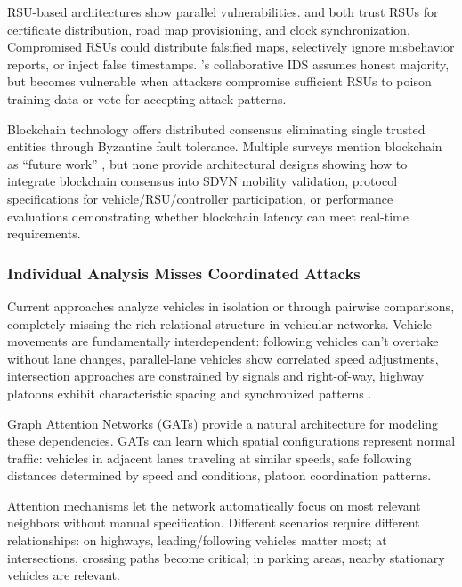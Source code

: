\documentclass[12pt, a4paper]{report}
\begin{document}
RSU-based architectures show parallel vulnerabilities. \cite{ghaleb2014} and \cite{raja2021} both trust RSUs for certificate distribution, road map provisioning, and clock synchronization. Compromised RSUs could distribute falsified maps, selectively ignore misbehavior reports, or inject false timestamps. \cite{raja2021}'s collaborative IDS assumes honest majority, but becomes vulnerable when attackers compromise sufficient RSUs to poison training data or vote for accepting attack patterns.

Blockchain technology offers distributed consensus eliminating single trusted entities through Byzantine fault tolerance. Multiple surveys mention blockchain as ``future work'' \cite{bhatia2019,arif2020,ravi2023}, but none provide architectural designs showing how to integrate blockchain consensus into SDVN mobility validation, protocol specifications for vehicle/RSU/controller participation, or performance evaluations demonstrating whether blockchain latency can meet real-time requirements.

\subsubsection{Individual Analysis Misses Coordinated Attacks}
\label{subsec:individual-analysis}

Current approaches analyze vehicles in isolation or through pairwise comparisons, completely missing the rich relational structure in vehicular networks. Vehicle movements are fundamentally interdependent: following vehicles can't overtake without lane changes, parallel-lane vehicles show correlated speed adjustments, intersection approaches are constrained by signals and right-of-way, highway platoons exhibit characteristic spacing and synchronized patterns \cite{ghaleb2014,he2016}.

Graph Attention Networks (GATs) provide a natural architecture for modeling these dependencies. GATs can learn which spatial configurations represent normal traffic: vehicles in adjacent lanes traveling at similar speeds, safe following distances determined by speed and conditions, platoon coordination patterns.

Attention mechanisms let the network automatically focus on most relevant neighbors without manual specification. Different scenarios require different relationships: on highways, leading/following vehicles matter most; at intersections, crossing paths become critical; in parking areas, nearby stationary vehicles are relevant.
\end{document}
